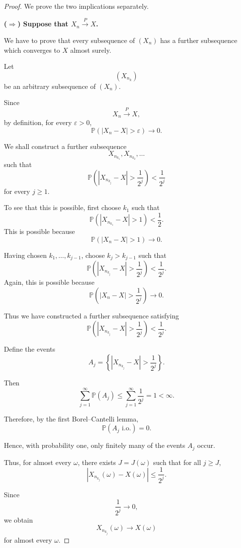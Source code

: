 \begin{proof}

We prove the two implications separately.

\medskip

\noindent
\textbf{($\Rightarrow$) Suppose that $X_n\xrightarrow{P}X$.}

We have to prove that every subsequence of $(X_n)$ has a further
subsequence which converges to $X$ almost surely.

Let
\[
    (X_{n_k})
\]
be an arbitrary subsequence of $(X_n)$.

Since
\[
    X_n\xrightarrow{P}X,
\]
by definition, for every $\varepsilon>0$,
\[
    \mathbb P(|X_n-X|>\varepsilon)\longrightarrow0.
\]

We shall construct a further subsequence
\[
    X_{n_{k_1}},X_{n_{k_2}},\ldots
\]
such that
\[
    \mathbb P\left(
        |X_{n_{k_j}}-X|>\frac{1}{2^j}
    \right)
    <\frac{1}{2^j}
\]
for every $j\geq1$.

To see that this is possible, first choose $k_1$ such that
\[
    \mathbb P\left(
        |X_{n_{k_1}}-X|>1
    \right)<\frac12.
\]
This is possible because
\[
    \mathbb P(|X_n-X|>1)\longrightarrow0.
\]

Having chosen $k_1,\ldots,k_{j-1}$, choose $k_j>k_{j-1}$ such that
\[
    \mathbb P\left(
        |X_{n_{k_j}}-X|>\frac{1}{2^j}
    \right)
    <\frac{1}{2^j}.
\]
Again, this is possible because
\[
    \mathbb P\left(
        |X_n-X|>\frac{1}{2^j}
    \right)
    \longrightarrow0.
\]

Thus we have constructed a further subsequence satisfying
\[
    \mathbb P\left(
        |X_{n_{k_j}}-X|>\frac{1}{2^j}
    \right)
    <\frac{1}{2^j}.
\]

Define the events
\[
    A_j
    =
    \left\{
        |X_{n_{k_j}}-X|>\frac{1}{2^j}
    \right\}.
\]

Then
\[
    \sum_{j=1}^{\infty}\mathbb P(A_j)
    \leq
    \sum_{j=1}^{\infty}\frac{1}{2^j}
    =1<\infty.
\]

Therefore, by the first Borel--Cantelli lemma,
\[
    \mathbb P(A_j\text{ i.o.})=0.
\]

Hence, with probability one, only finitely many of the events $A_j$
occur.

Thus, for almost every $\omega$, there exists $J=J(\omega)$ such that
for all $j\geq J$,
\[
    |X_{n_{k_j}}(\omega)-X(\omega)|
    \leq\frac{1}{2^j}.
\]

Since
\[
    \frac{1}{2^j}\longrightarrow0,
\]
we obtain
\[
    X_{n_{k_j}}(\omega)\longrightarrow X(\omega)
\]
for almost every $\omega$.


\end{proof}
